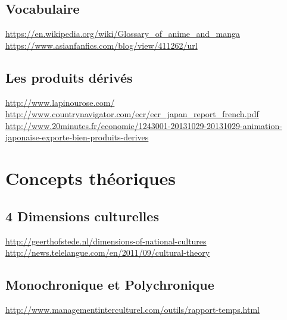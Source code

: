\subsection{Vocabulaire}
\noindent
\url{https://en.wikipedia.org/wiki/Glossary_of_anime_and_manga}\\
\url{https://www.asianfanfics.com/blog/view/411262/url}

\subsection{Les produits dérivés}
\noindent
\url{http://www.lapinourose.com/}\\
\url{http://www.countrynavigator.com/ecr/ecr_japan_report_french.pdf}\\
\url{http://www.20minutes.fr/economie/1243001-20131029-20131029-animation-japonaise-exporte-bien-produits-derives}

\section{Concepts théoriques}
\subsection{4 Dimensions culturelles}
\noindent
\url{http://geerthofstede.nl/dimensions-of-national-cultures}\\
\url{http://news.telelangue.com/en/2011/09/cultural-theory}

\subsection{Monochronique et Polychronique}
\noindent
\url{http://www.managementinterculturel.com/outils/rapport-temps.html}\\
